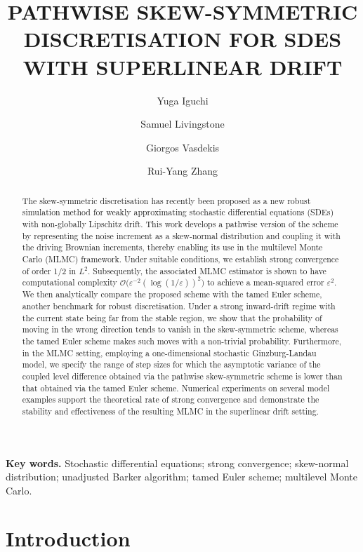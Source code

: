 \documentclass[11pt]{article}
\title{\Large \MakeUppercase{Pathwise skew-symmetric discretisation for SDEs with superlinear drift}}
\author[1]{Yuga Iguchi}
\author[2]{Samuel Livingstone}
\author[3]{Giorgos Vasdekis}
\author[1]{Rui-Yang Zhang}
\affil[1]{School of Mathematical Sciences, Lancaster University.}
\affil[2]{Department of Statistical Science, University College London.}
\affil[3]{School of Mathematics, Statistics and Physics, Newcastle University.}
\begin{document}
\maketitle 
% 
\begin{abstract}
    The skew-symmetric discretisation has recently been proposed as a new robust simulation method for weakly approximating stochastic differential equations (SDEs) with non-globally Lipschitz drift. This work develops a pathwise version of the scheme by representing the noise increment as a skew-normal distribution and coupling it with the driving Brownian increments, thereby enabling its use in the multilevel Monte Carlo (MLMC) framework. Under suitable conditions, we establish strong convergence of order 1/2 in $L^2$. Subsequently, the associated MLMC estimator is shown to have computational complexity $\mathcal{O} \bigl(\varepsilon^{-2} (\log (1/\varepsilon))^2 \bigr)$ to achieve a mean-squared error $\varepsilon^2$. We then analytically compare the proposed scheme with the tamed Euler scheme, another benchmark for robust discretisation. Under a strong inward-drift regime with the current state being far from the stable region, we show that the probability of moving in the wrong direction tends to vanish in the skew-symmetric scheme, whereas the tamed Euler scheme makes such moves with a non-trivial probability. Furthermore, in the MLMC setting, employing a one-dimensional stochastic Ginzburg-Landau model, we specify the range of step sizes for which the asymptotic variance of the coupled level difference obtained via the pathwise skew-symmetric scheme is lower than that obtained via the tamed Euler scheme. Numerical experiments on several model examples support the theoretical rate of strong convergence and demonstrate the stability and effectiveness of the resulting MLMC in the superlinear drift setting.
\end{abstract}
%
\textbf{Key  words.} Stochastic differential equations; strong convergence; skew-normal distribution; unadjusted Barker algorithm; tamed Euler scheme; multilevel Monte Carlo.  


\section{Introduction} \label{sec:intro}
\end{document}
